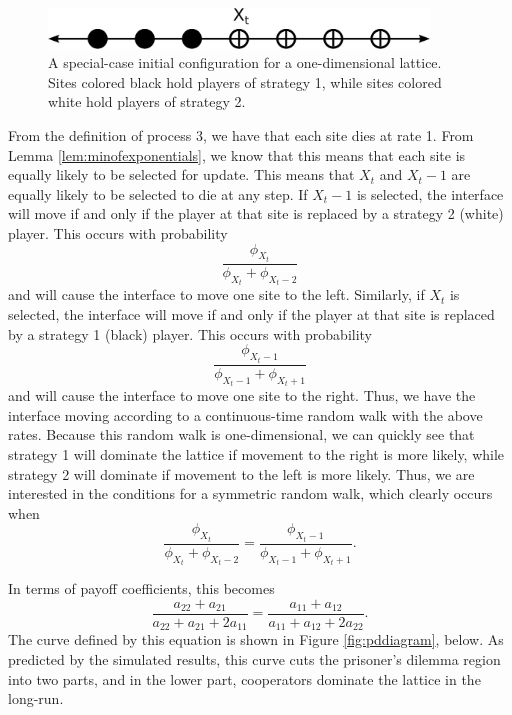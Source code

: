\documentclass[notitlepage,reqno]{amsart}
\begin{document}
\begin{figure}[h]
\includegraphics[width=0.9\textwidth]{./images/1dInitialConfig_w_label.eps}
\caption{A special-case initial configuration for a one-dimensional
  lattice. Sites colored black hold players of strategy 1, while sites
colored white hold players of strategy 2.}
\label{fig:initialconfiguration}
\end{figure}

From the definition of process 3, we have that each site dies at rate
1. From Lemma \ref{lem:minofexponentials}, we know that this means
that each site is equally likely to be selected for update. This means
that $X_t$ and $X_t-1$ are equally likely to be selected to die at any
step. If $X_t-1$ is selected, the interface will move if and only if
the player at that site is replaced by a strategy 2 (white)
player. This occurs with probability
\[
    \frac{\phi_{X_t}}{\phi_{X_t} + \phi_{X_t-2}}
\]
and will cause the interface to move one site to the left. Similarly,
if $X_t$ is selected, the interface will move if and only if the
player at that site is replaced by a strategy 1 (black) player. This
occurs with probability
\[
    \frac{\phi_{X_t-1}}{\phi_{X_t-1} + \phi_{X_t+1}}
\]
and will cause the interface to move one site to the right. Thus, we
have the interface moving according to a continuous-time random walk
with the above rates. Because this random walk is one-dimensional, we
can quickly see that strategy 1 will dominate the lattice if movement
to the right is more likely, while strategy 2 will dominate if
movement to the left is more likely. Thus, we are interested in the
conditions for a symmetric random walk, which clearly occurs when
\[
    \frac{\phi_{X_t}}{\phi_{X_t} + \phi_{X_t-2}} = \frac{\phi_{X_t-1}}{\phi_{X_t-1} + \phi_{X_t+1}}.
\]

In terms of payoff coefficients, this becomes
\[
    \frac{a_{22}+a_{21}}{a_{22}+a_{21} + 2a_{11}} =
    \frac{a_{11}+a_{12}}{a_{11} + a_{12} + 2a_{22}}.
\]
The curve defined by this equation is shown in Figure
\ref{fig:pddiagram}, below. As predicted by the simulated results, this
curve cuts the prisoner's dilemma region into two parts, and in the
lower part, cooperators dominate the lattice in the long-run.
\end{document}
